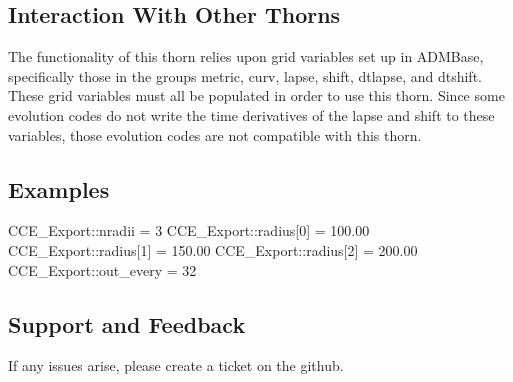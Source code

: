 \subsection{Interaction With Other Thorns}

The functionality of this thorn relies upon grid variables set up in ADMBase, specifically those in the groups metric, curv, 
lapse, shift, dtlapse, and dtshift. These grid variables must all be populated in order to use this thorn. Since some 
evolution codes do not write the time derivatives of the lapse and shift to these variables, those evolution codes are not 
compatible with this thorn.

\subsection{Examples}

CCE_Export::nradii       = 3
CCE_Export::radius[0]    = 100.00
CCE_Export::radius[1]    = 150.00
CCE_Export::radius[2]    = 200.00
CCE_Export::out_every    = 32

\subsection{Support and Feedback}

If any issues arise, please create a ticket on the github.


\begin{thebibliography}{9}

\end{thebibliography}



